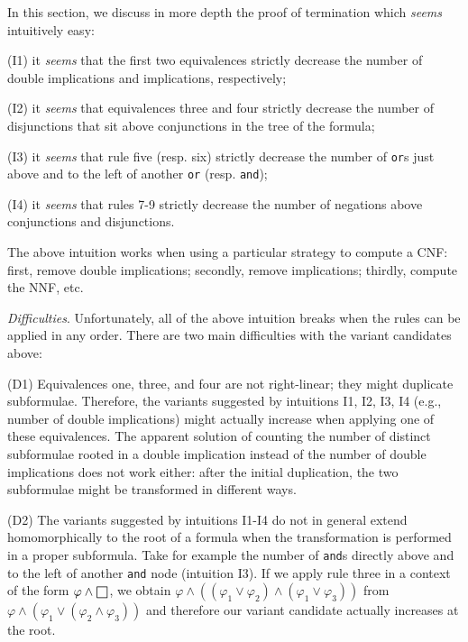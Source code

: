 \documentclass[12pt]{report}
\def\msquare{\mathord{\scalerel*{\Box}{gX}}}
\begin{document}
In this section, we discuss in more depth the proof of termination 
which \emph{seems} intuitively easy:
%
\begin{enumerate*}
%
\item[(I1)] it \emph{seems} that the first two equivalences strictly
  decrease the number of double implications and implications,
  respectively;
%
\item[(I2)] it \emph{seems} that equivalences three and four strictly
  decrease the number of disjunctions that sit above conjunctions in
  the tree of the formula;
%
\item[(I3)] it \emph{seems} that rule five (resp. six) strictly decrease
  the number of \texttt{or}s just above and to the left of another
  \texttt{or} (resp. \texttt{and});
%
\item[(I4)] it \emph{seems} that rules 7-9 strictly decrease the number
  of negations above conjunctions and disjunctions.
%
\end{enumerate*}
%
The above intuition works when using a particular strategy to compute
a CNF: first, remove double implications; secondly, remove
implications; thirdly, compute the NNF, etc.

\emph{Difficulties}. Unfortunately, all of the above intuition breaks
when the rules can be applied in any order. There are two main
difficulties with the variant candidates above:
%
\begin{enumerate*}
%
\item[(D1)]\label{dif:d1} Equivalences one, three, and four are not
  right-linear; they might duplicate subformulae. Therefore, the
  variants suggested by intuitions I1, I2, I3, I4 (e.g., number of
  double implications) might actually increase when applying one of
  these equivalences. The apparent solution of counting the number of
  distinct subformulae rooted in a double implication instead of the
  number of double implications does not work either: after the
  initial duplication, the two subformulae might be transformed in
  different ways.
%
\item[(D2)] The variants suggested by intuitions I1-I4 do not in general
  extend homomorphically to the root of a formula when the
  transformation is performed in a proper subformula. Take for example
  the number of \texttt{and}s directly above and to the left of
  another \texttt{and} node (intuition I3). If we apply rule three in
  a context of the form \( \varphi \land \msquare \), we obtain
  \( \varphi \land ((\varphi_1 \lor \varphi_2) \land (\varphi_1 \lor
  \varphi_3)) \) from
  \( \varphi \land ( \varphi_1 \lor (\varphi_2 \land \varphi_3) ) \)
  and therefore our variant candidate actually increases at the root.
%
\end{enumerate*}
\end{document}
